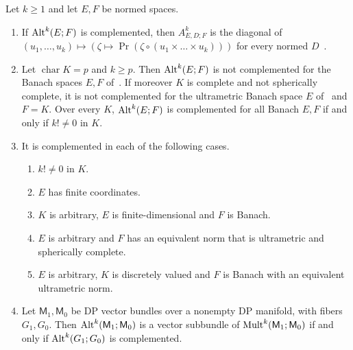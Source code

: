 \begin{proposition}\label{dp:prop:subbundle}
Let $k\ge1$ and let $E,F$ be normed spaces.
\begin{enumerate}
\item If $\operatorname{Alt}^k(E;F)$ is complemented, then $A^k_{E,D;F}$ is the diagonal of $(u_1,\dots,u_k)\mapsto(\zeta\mapsto\operatorname{Pr}(\zeta\circ(u_1\times\dots\times u_k)))$ for every normed $D$~\cite[Proposition~5.1 and its proof]{I}.
\item Let $\operatorname{char}K=p$ and $k\ge p$. Then $\operatorname{Alt}^k(E;F)$ is not complemented for the Banach spaces $E,F$ of~\cite[Theorem~7.2(1)]{I}. If moreover $K$ is complete and not spherically complete, it is not complemented for the ultrametric Banach space $E$ of~\cite[Theorem~7.2(2)]{I} and $F=K$. Over every $K$, $\operatorname{Alt}^k(E;F)$ is complemented for all Banach $E,F$ if and only if $k!\ne0$ in $K$.
\item It is complemented in each of the following cases.
\begin{enumerate}
\item $k!\ne0$ in $K$.
\item $E$ has finite coordinates.
\item $K$ is arbitrary, $E$ is finite-dimensional and $F$ is Banach.
\item $E$ is arbitrary and $F$ has an equivalent norm that is ultrametric and spherically complete.
\item $E$ is arbitrary, $K$ is discretely valued and $F$ is Banach with an equivalent ultrametric norm.
\end{enumerate}
\item Let $\mathsf M_1,\mathsf M_0$ be DP vector bundles over a nonempty DP manifold, with fibers $G_1,G_0$. Then $\operatorname{Alt}^k(\mathsf M_1;\mathsf M_0)$ is a vector subbundle of $\operatorname{Mult}^k(\mathsf M_1;\mathsf M_0)$ if and only if $\operatorname{Alt}^k(G_1;G_0)$ is complemented.
\end{enumerate}
\end{proposition}


